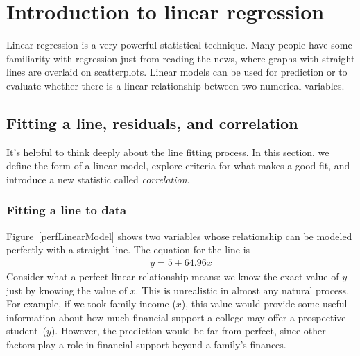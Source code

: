 \chapter{Introduction to linear regression}
\label{linRegrForTwoVar}
\label{ch_regr_simple_linear}
\renewcommand{\chapterfolder}{ch_regr_simple_linear}


Linear regression is a very powerful statistical technique.
Many people have some familiarity with regression just from
reading the news, where graphs with straight lines are overlaid
on scatterplots.
Linear models can be used for prediction or to evaluate whether
there is a linear relationship between two numerical variables.



\section{Fitting a line, residuals, and correlation}
\label{fitting_line_to_data_section}

It's helpful to think deeply about the line fitting process.
In this section, we define the form of a linear model,
explore criteria for what makes a good fit,
and introduce a new statistic called
\emph{correlation}.



\subsection{Fitting a line to data}

Figure~\ref{perfLinearModel} shows two variables whose
relationship can be modeled perfectly with a straight line.
The equation for the line is
\begin{eqnarray*}
y = 5 + 64.96 x
\end{eqnarray*}
Consider what a perfect linear relationship means:
we know the exact value of $y$ just by knowing
the value of $x$.
This is unrealistic in almost any natural process.
For example, if we took family income ($x$),
this value would provide some useful information about
how much financial support a college may offer a prospective
student~($y$).
However, the prediction would be far from perfect,
since other factors play a role in financial support
beyond a family's finances.


